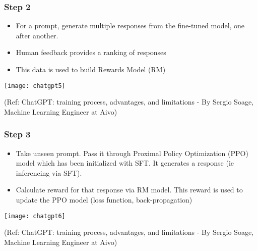\begin{frame}[fragile]\frametitle{Step 2}

\begin{itemize}
\item For a prompt, generate multiple responses from the fine-tuned model, one after another.
\item Human feedback provides a ranking of responses
\item This data is used to build Rewards Model (RM)
\end{itemize}	 

			\begin{center}
			\texttt{[image: chatgpt5]}
			
			\end{center}		
			
			{\tiny (Ref: ChatGPT: training process, advantages, and limitations - By Sergio Soage, Machine Learning Engineer at Aivo)}
			
\end{frame}




			
			
			


\begin{frame}[fragile]\frametitle{Step 3}

\begin{itemize}
\item Take unseen prompt. Pass it through Proximal Policy Optimization (PPO) model which has been initialized with SFT. It generates a response (ie inferencing via SFT).
\item Calculate reward for that response via RM model. This reward is used to update the PPO model (loss function, back-propagation)
\end{itemize}	 

			\begin{center}
			\texttt{[image: chatgpt6]}
			
			\end{center}		
			
			{\tiny (Ref: ChatGPT: training process, advantages, and limitations - By Sergio Soage, Machine Learning Engineer at Aivo)}
			
\end{frame}


